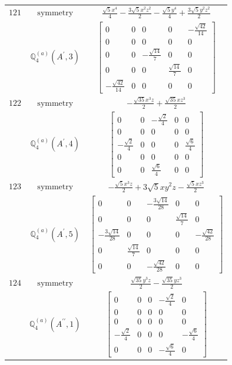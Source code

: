 \documentclass[fleqn,8pt,landscape]{jsarticle}
\begin{document}
\begin{longtable}{ccc}
$ 121 $ & $ \text{symmetry} $ & $ \frac{\sqrt{5} x^{4}}{4} - \frac{3 \sqrt{5} x^{2} z^{2}}{2} - \frac{\sqrt{5} y^{4}}{4} + \frac{3 \sqrt{5} y^{2} z^{2}}{2} $ \\
$  $ & $ \mathbb{Q}_{4}^{(a)}(A^{\prime},3) $ & $ \begin{bmatrix} 0 & 0 & 0 & 0 & - \frac{\sqrt{42}}{14} \\ 0 & 0 & 0 & 0 & 0 \\ 0 & 0 & - \frac{\sqrt{14}}{7} & 0 & 0 \\ 0 & 0 & 0 & \frac{\sqrt{14}}{7} & 0 \\ - \frac{\sqrt{42}}{14} & 0 & 0 & 0 & 0 \end{bmatrix} $ \\ \hline
$ 122 $ & $ \text{symmetry} $ & $ - \frac{\sqrt{35} x^{3} z}{2} + \frac{\sqrt{35} x z^{3}}{2} $ \\
$  $ & $ \mathbb{Q}_{4}^{(a)}(A^{\prime},4) $ & $ \begin{bmatrix} 0 & 0 & - \frac{\sqrt{2}}{4} & 0 & 0 \\ 0 & 0 & 0 & 0 & 0 \\ - \frac{\sqrt{2}}{4} & 0 & 0 & 0 & \frac{\sqrt{6}}{4} \\ 0 & 0 & 0 & 0 & 0 \\ 0 & 0 & \frac{\sqrt{6}}{4} & 0 & 0 \end{bmatrix} $ \\ \hline
$ 123 $ & $ \text{symmetry} $ & $ - \frac{\sqrt{5} x^{3} z}{2} + 3 \sqrt{5} x y^{2} z - \frac{\sqrt{5} x z^{3}}{2} $ \\
$  $ & $ \mathbb{Q}_{4}^{(a)}(A^{\prime},5) $ & $ \begin{bmatrix} 0 & 0 & - \frac{3 \sqrt{14}}{28} & 0 & 0 \\ 0 & 0 & 0 & \frac{\sqrt{14}}{7} & 0 \\ - \frac{3 \sqrt{14}}{28} & 0 & 0 & 0 & - \frac{\sqrt{42}}{28} \\ 0 & \frac{\sqrt{14}}{7} & 0 & 0 & 0 \\ 0 & 0 & - \frac{\sqrt{42}}{28} & 0 & 0 \end{bmatrix} $ \\ \hline
$ 124 $ & $ \text{symmetry} $ & $ \frac{\sqrt{35} y^{3} z}{2} - \frac{\sqrt{35} y z^{3}}{2} $ \\
$  $ & $ \mathbb{Q}_{4}^{(a)}(A^{\prime\prime},1) $ & $ \begin{bmatrix} 0 & 0 & 0 & - \frac{\sqrt{2}}{4} & 0 \\ 0 & 0 & 0 & 0 & 0 \\ 0 & 0 & 0 & 0 & 0 \\ - \frac{\sqrt{2}}{4} & 0 & 0 & 0 & - \frac{\sqrt{6}}{4} \\ 0 & 0 & 0 & - \frac{\sqrt{6}}{4} & 0 \end{bmatrix} $ \\ \hline

\end{longtable}
\end{document}

